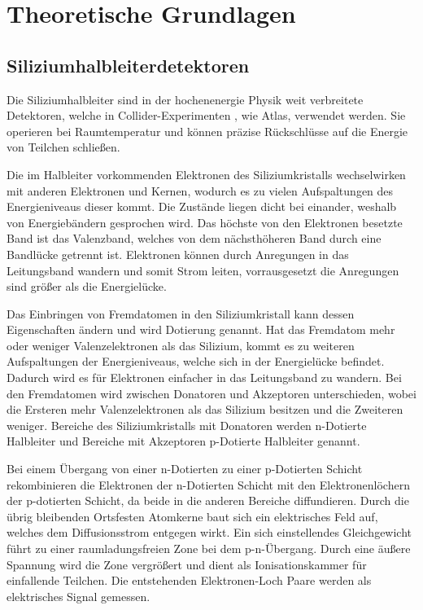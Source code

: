 \chapter{Theoretische Grundlagen}


\section{Siliziumhalbleiterdetektoren}

Die Siliziumhalbleiter sind in der hochenenergie Physik weit verbreitete
Detektoren, welche in Collider-Experimenten , wie Atlas, verwendet werden.
Sie operieren bei Raumtemperatur und können präzise Rückschlüsse auf die
Energie von Teilchen schließen.


Die im Halbleiter vorkommenden Elektronen des Siliziumkristalls wechselwirken mit anderen Elektronen und
Kernen, wodurch es zu vielen Aufspaltungen des Energieniveaus dieser kommt. Die
Zustände liegen dicht bei einander, weshalb von Energiebändern gesprochen wird.
Das höchste von den Elektronen besetzte Band ist das Valenzband, welches von dem
nächsthöheren Band durch eine Bandlücke getrennt ist. Elektronen können
durch Anregungen in das Leitungsband wandern und somit Strom leiten, vorrausgesetzt
die Anregungen sind größer als die Energielücke.

Das Einbringen von Fremdatomen in den Siliziumkristall kann dessen Eigenschaften ändern
und wird Dotierung genannt.
Hat das Fremdatom mehr oder weniger Valenzelektronen als das Silizium, kommt
es zu weiteren Aufspaltungen der Energieniveaus, welche sich in der Energielücke
befindet. Dadurch wird es für Elektronen einfacher in das Leitungsband zu wandern.
Bei den Fremdatomen wird zwischen Donatoren und Akzeptoren unterschieden, wobei die
Ersteren mehr Valenzelektronen als das Silizium besitzen und die Zweiteren weniger.
Bereiche des Siliziumkristalls mit Donatoren werden n-Dotierte Halbleiter
und Bereiche mit Akzeptoren p-Dotierte Halbleiter genannt.

Bei einem Übergang von einer n-Dotierten zu einer p-Dotierten Schicht rekombinieren
die Elektronen der n-Dotierten Schicht mit den Elektronenlöchern der p-dotierten Schicht, da beide
in die anderen Bereiche diffundieren. Durch die übrig bleibenden Ortsfesten Atomkerne
baut sich ein elektrisches Feld auf, welches dem Diffusionsstrom entgegen wirkt.
Ein sich einstellendes Gleichgewicht führt zu einer raumladungsfreien Zone bei
dem p-n-Übergang.
Durch eine äußere Spannung wird die Zone vergrößert und dient als Ionisationskammer für einfallende Teilchen.
Die entstehenden Elektronen-Loch Paare werden als elektrisches Signal gemessen.


